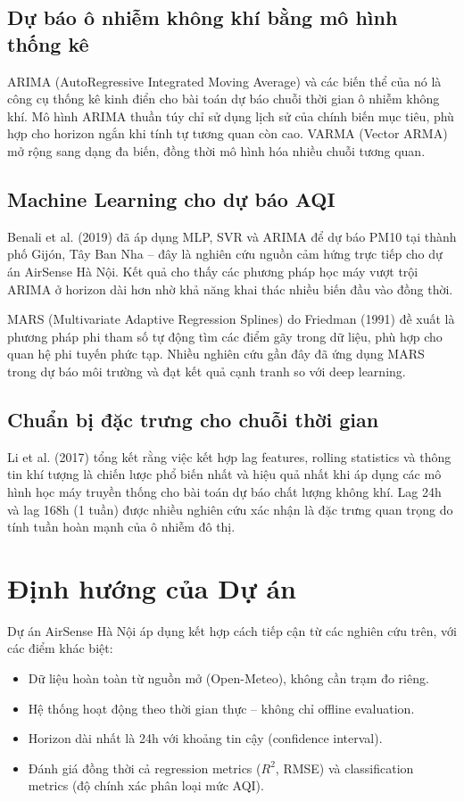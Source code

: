 \documentclass[12pt,a4paper]{report}
\begin{document}
\subsection{Dự báo ô nhiễm không khí bằng mô hình thống kê}

ARIMA (AutoRegressive Integrated Moving Average) và các biến thể của nó là công cụ thống kê kinh điển cho bài toán dự báo chuỗi thời gian ô nhiễm không khí. Mô hình ARIMA thuần túy chỉ sử dụng lịch sử của chính biến mục tiêu, phù hợp cho horizon ngắn khi tính tự tương quan còn cao. VARMA (Vector ARMA) mở rộng sang dạng đa biến, đồng thời mô hình hóa nhiều chuỗi tương quan.

\subsection{Machine Learning cho dự báo AQI}

Benali et al. (2019) đã áp dụng MLP, SVR và ARIMA để dự báo PM10 tại thành phố Gijón, Tây Ban Nha -- đây là nghiên cứu nguồn cảm hứng trực tiếp cho dự án AirSense Hà Nội. Kết quả cho thấy các phương pháp học máy vượt trội ARIMA ở horizon dài hơn nhờ khả năng khai thác nhiều biến đầu vào đồng thời.

MARS (Multivariate Adaptive Regression Splines) do Friedman (1991) đề xuất là phương pháp phi tham số tự động tìm các điểm gãy trong dữ liệu, phù hợp cho quan hệ phi tuyến phức tạp. Nhiều nghiên cứu gần đây đã ứng dụng MARS trong dự báo môi trường và đạt kết quả cạnh tranh so với deep learning.

\subsection{Chuẩn bị đặc trưng cho chuỗi thời gian}

Li et al. (2017) tổng kết rằng việc kết hợp lag features, rolling statistics và thông tin khí tượng là chiến lược phổ biến nhất và hiệu quả nhất khi áp dụng các mô hình học máy truyền thống cho bài toán dự báo chất lượng không khí. Lag 24h và lag 168h (1 tuần) được nhiều nghiên cứu xác nhận là đặc trưng quan trọng do tính tuần hoàn mạnh của ô nhiễm đô thị.

\section{Định hướng của Dự án}

Dự án AirSense Hà Nội áp dụng kết hợp cách tiếp cận từ các nghiên cứu trên, với các điểm khác biệt:
\begin{itemize}
  \item Dữ liệu hoàn toàn từ nguồn mở (Open-Meteo), không cần trạm đo riêng.
  \item Hệ thống hoạt động theo thời gian thực -- không chỉ offline evaluation.
  \item Horizon dài nhất là 24h với khoảng tin cậy (confidence interval).
  \item Đánh giá đồng thời cả regression metrics ($R^2$, RMSE) và classification metrics (độ chính xác phân loại mức AQI).
\end{itemize}
\end{document}
